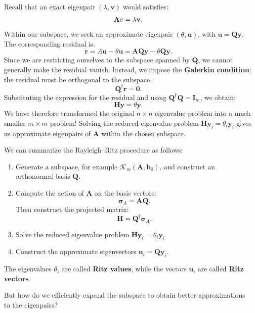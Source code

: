 \documentclass[10pt,aspectratio=169]{beamer}
\begin{document}
\begin{frame}
	Recall that an exact eigenpair $(\lambda, \mathbf v)$ would satisfies:
	\begin{equation*}
		\mathbf A\mathbf \mathbf v=\lambda\mathbf v.
	\end{equation*}
	Within our subspace, we seek an approximate eigenpair $(\theta,\mathbf u)$, with $\mathbf u=\mathbf Q\mathbf y$. The corresponding residual is:
	\begin{equation*}
		\mathbf r= A\mathbf u-\theta\mathbf u = \mathbf A\mathbf Q\mathbf y-\theta\mathbf Q\mathbf y.
	\end{equation*}
	Since we are restricting ourselves to the subspace spanned by $\mathbf Q$, we cannot generally make the residual vanish. Instead, we impose the \textbf{Galerkin condition}: the residual must be orthogonal to the subspace.
	\begin{equation*}
		\mathbf Q^\dagger\mathbf r=\mathbf 0.
	\end{equation*}
	\pause
	Substituting the expression for the residual and using $\mathbf Q^\dagger\mathbf Q=\mathbf I_m$, we obtain:
	\begin{equation*}
		\boxed{\mathbf H\mathbf y=\theta\mathbf y.}
	\end{equation*}
	We have therefore transformed the original $n\times n$ eigenvalue problem into a much smaller $m\times m$ problem!
	Solving the reduced eigenvalue problem $\mathbf H\mathbf y_i=\theta_i\mathbf y_i$ gives us approximate eigenpairs of $\mathbf A$ within the chosen subspace.
\end{frame}

\begin{frame}
	We can summarize the Rayleigh--Ritz procedure as follows:
	\begin{enumerate}
		\item Generate a subspace, for example $\mathcal K_m(\mathbf A,\mathbf b_0)$, and construct an orthonormal basis $\mathbf Q$.
		\item Compute the action of $\mathbf A$ on the basis vectors:
		\begin{equation*}
			\boldsymbol{\sigma}_A=\mathbf A\mathbf Q.
		\end{equation*}
		Then construct the projected matrix:
		\begin{equation*}
			\mathbf H=\mathbf Q^\dagger\boldsymbol{\sigma}_A.
		\end{equation*}
		\item Solve the reduced eigenvalue problem $\mathbf H\mathbf y_i=\theta_i\mathbf y_i$.
		\item Construct the approximate eigenvectors $\mathbf u_i=\mathbf Q\mathbf y_i$.
	\end{enumerate}
	
	\medskip
	The eigenvalues $\theta_i$ are called \textbf{Ritz values}, while the vectors $\mathbf u_i$ are called \textbf{Ritz vectors}.
	
	\pause
	\medskip
	\begin{center}
		\Large
		But how do we efficiently expand the subspace to obtain better approximations to the eigenpairs?
	\end{center}
\end{frame}
\end{document}
